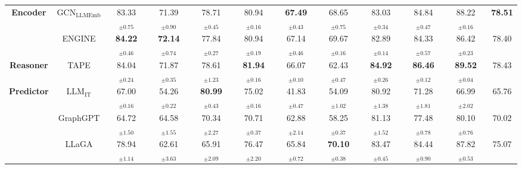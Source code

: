 \begin{table*}[!t]
{\begin{tabular}{cc|cccccccccc}
        \multirow{2}{*}{\textbf{Encoder}} 
       & $\text{GCN}_{\text{LLMEmb}}$ & 83.33$_{\pm \text{0.75}}$ & 71.39$_{\pm \text{0.90}}$ & 78.71$_{\pm \text{0.45}}$ & \cellcolor{orange!10} 80.94$_{\pm \text{0.16}}$ & \cellcolor{orange!25} \textbf{67.49$_{\pm \text{0.43}}$} & 68.65$_{\pm \text{0.75}}$ &  83.03$_{\pm \text{0.34}}$ & \cellcolor{orange!10} 84.84$_{\pm \text{0.47}}$ & \cellcolor{orange!10} 88.22$_{\pm \text{0.16}}$ & \cellcolor{orange!25} \textbf{78.51} \\ 
       & ENGINE & \cellcolor{orange!25} \textbf{84.22$_{\pm \text{0.46}}$} & \cellcolor{orange!25} \textbf{72.14$_{\pm \text{0.74}}$}
        & 77.84$_{\pm \text{0.27}}$ & 80.94$_{\pm \text{0.19}}$ & \cellcolor{orange!10} 67.14$_{\pm \text{0.46}}$ & \cellcolor{orange!10} 69.67$_{\pm \text{0.16}}$ & 82.89$_{\pm \text{0.14}}$ & 84.33$_{\pm \text{0.57}}$ & 86.42$_{\pm \text{0.23}}$ & 78.40  \\ \midrule
        
       \textbf{Reasoner} & TAPE &  \cellcolor{orange!10} 84.04$_{\pm \text{0.24}}$ & \cellcolor{orange!10} 71.87$_{\pm \text{0.35}}$ & 78.61$_{\pm \text{1.23}}$ & \cellcolor{orange!25} \textbf{81.94$_{\pm \text{0.16}}$} & 66.07$_{\pm \text{0.10}}$ & 62.43$_{\pm \text{0.47}}$ & \cellcolor{orange!25} \textbf{84.92$_{\pm \text{0.26}}$} & \cellcolor{orange!25} \textbf{86.46$_{\pm \text{0.12}}$} & \cellcolor{orange!25} \textbf{89.52$_{\pm \text{0.04}}$} & \cellcolor{orange!10} 78.43  \\  \midrule
       
      \multirow{3}{*}{\textbf{Predictor}} & $\text{LLM}_{\text{IT}}$  &  67.00$_{\pm \text{0.16}}$ & 54.26$_{\pm \text{0.22}}$ & \cellcolor{orange!25} \textbf{80.99$_{\pm \text{0.43}}$} & 75.02$_{\pm \text{0.16}}$ & 41.83$_{\pm \text{0.47}}$ & 54.09$_{\pm \text{1.02}}$ & 80.92$_{\pm \text{1.38}}$ & 71.28$_{\pm \text{1.81}}$ & 66.99$_{\pm \text{2.02}}$ & 65.76 \\ 
       & GraphGPT & 64.72$_{\pm \text{1.50}}$ & 64.58$_{\pm \text{1.55}}$ & 70.34$_{\pm \text{2.27}}$ & 70.71$_{\pm \text{0.37}}$ & 62.88$_{\pm \text{2.14}}$ & 58.25$_{\pm \text{0.37}}$ & 81.13$_{\pm \text{1.52}}$ & 77.48$_{\pm \text{0.78}}$ & 80.10$_{\pm \text{0.76}}$ & 70.02 \\ 
       & LLaGA & 78.94$_{\pm \text{1.14}}$ & 62.61$_{\pm \text{3.63}}$ & 65.91$_{\pm \text{2.09}}$ & 76.47$_{\pm \text{2.20}}$ & 65.84$_{\pm \text{0.72}}$ &  \cellcolor{orange!25} \textbf{70.10$_{\pm \text{0.38}}$} & 83.47$_{\pm \text{0.45}}$ & 84.44$_{\pm \text{0.90}}$ & 87.82$_{\pm \text{0.53}}$  & 75.07 \\
       \bottomrule
    \end{tabular}
    }


\end{table*}
